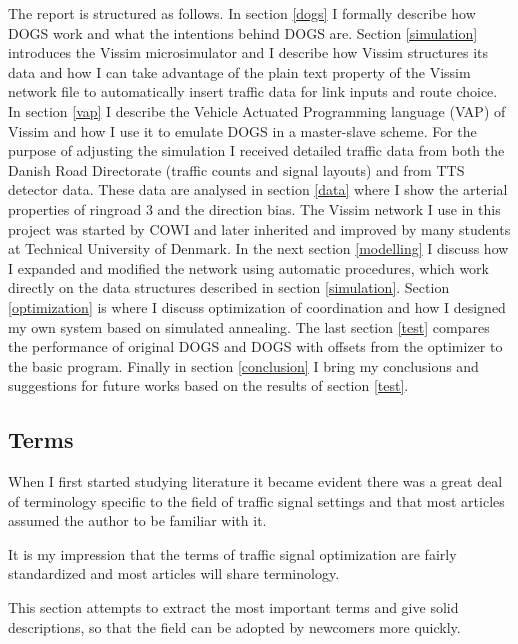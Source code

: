 The report is structured as follows. In section \ref{dogs} I formally describe how DOGS work and what the intentions behind DOGS are. Section \ref{simulation} introduces the Vissim microsimulator and I describe how Vissim structures its data and how I can take advantage of the plain text property of the Vissim network file to automatically insert traffic data for link inputs and route choice. In section \ref{vap} I describe the Vehicle Actuated Programming language (VAP) of Vissim and how I use it to emulate DOGS in a master-slave scheme. For the purpose of adjusting the simulation I received detailed traffic data from both the Danish Road Directorate (traffic counts and signal layouts) and from TTS detector data. These data are analysed in section \ref{data} where I show the arterial properties of ringroad 3 and the direction bias. The Vissim network I use in this project was started by COWI and later inherited and improved by many students at Technical University of Denmark. In the next section \ref{modelling} I discuss how I expanded and modified the network using automatic procedures, which work directly on the data structures described in section \ref{simulation}. Section \ref{optimization} is where I discuss optimization of coordination and how I designed my own system based on simulated annealing. The last section \ref{test} compares the performance of original DOGS and DOGS with offsets from the optimizer to the basic program. Finally in section \ref{conclusion} I bring my conclusions and suggestions for future works based on the results of section \ref{test}.

\subsection{Terms}
\label{vocabulary}
When I first started studying literature \cite{forprojekt} it became evident there was a great deal of terminology specific to the field of traffic signal settings and that most articles assumed the author to be familiar with it. 

It is my impression that the terms of traffic signal optimization are fairly standardized and most articles will share terminology.

This section attempts to extract the most important terms and give solid descriptions, so that the field can be adopted by newcomers more quickly.

